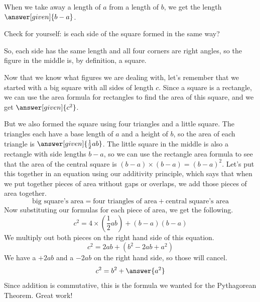 \documentclass{ximera}
\begin{document}
\begin{explanation}
\begin{image}
\end{image}
When we take away a length of $a$ from a length of $b$, we get the length $\answer[given]{b-a}$.


Check for yourself: is each side of the square formed in the same way?
\begin{multipleChoice}
\end{multipleChoice}


So, each side has the same length and all four corners are right angles, so the figure in the middle is, by definition, a square.

Now that we know what figures we are dealing with, let's remember that we started with a big square with all sides of length $c$. Since a square is a rectangle, we can use the area formula for rectangles to find the area of this square, and we get $\answer[given]{c^2}$.

But we also formed the square using four triangles and a little square. The triangles each have a base length of $a$ and a height of $b$, so the area of each triangle is $\answer[given]{\frac{1}{2}ab}$. The little square in the middle is also a rectangle with side lengths $b-a$, so we can use the rectangle area formula to see that the area of the central square is $(b-a)\times (b-a) = (b-a)^2$. Let's put this together in an equation using our additivity principle, which says that when we put together pieces of area without gaps or overlaps, we add those pieces of area together.
\[
\textrm{big square's area} = \textrm{four triangles of area} + \textrm{central square's area}
\]
Now substituting our formulas for each piece of area, we get the following.
\[
c^2 = 4 \times \left (\frac12 a b \right) + (b-a)(b-a)
\]
We multiply out both pieces on the right hand side of this equation.
\[
c^2 = 2ab + (b^2 - 2ab + a^2)
\]
We have a $+2ab$ and a $-2ab$ on the right hand side, so those will cancel.
\[
c^2 = b^2 + \answer{a^2}
\]
Since addition is commutative, this is the formula we wanted for the Pythagorean Theorem. Great work!
\end{explanation}
\end{document}
